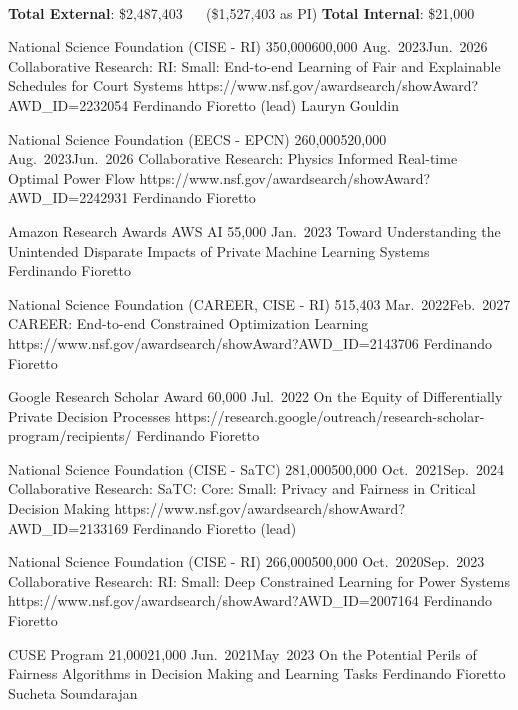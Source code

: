 \
\begin{keywords}
{\textbf{Total External}: \$2,487,403 ~~ (\$1,527,403 as PI) \hspace{8pt} \textbf{Total Internal}: \$21,000}%
\end{keywords}


\begin{projects}
	\grantentrycoPI
	{National Science Foundation (CISE - RI)}
	{350,000}{600,000}
	{Aug.~2023}{Jun.~2026}
	{Collaborative Research: RI: Small: End-to-end Learning of Fair and Explainable Schedules for Court Systems}
	{https://www.nsf.gov/awardsearch/showAward?AWD_ID=2232054}
	{Ferdinando Fioretto (lead)}
	{Lauryn Gouldin}

	\grantentryPI
	{National Science Foundation (EECS - EPCN)}
	{260,000}{520,000}
	{Aug.~2023}{Jun.~2026}
	{Collaborative Research: Physics Informed Real-time Optimal Power Flow}
	{https://www.nsf.gov/awardsearch/showAward?AWD_ID=2242931}
	{Ferdinando Fioretto}

	\grantentrySinglePI
	{Amazon Research Awards AWS AI}
	{55,000}
	{Jan.~2023}{}
	{Toward Understanding the Unintended Disparate Impacts of  Private Machine Learning Systems}
	{~}
	{Ferdinando Fioretto}

	\grantentrySinglePI
	{National Science Foundation (CAREER, CISE - RI)}
	{515,403}
	{Mar.~2022}{Feb.~2027}
	{CAREER: End-to-end Constrained Optimization Learning}
	{https://www.nsf.gov/awardsearch/showAward?AWD_ID=2143706}
	{Ferdinando Fioretto}

	\grantentrySinglePI
	{Google Research Scholar Award}
	{60,000}
	{Jul.~2022}{}
	{On the Equity of Differentially Private Decision Processes}
	{https://research.google/outreach/research-scholar-program/recipients/}
	{Ferdinando Fioretto}

	\grantentryPI
	{National Science Foundation (CISE - SaTC)}
	{281,000}{500,000}
	{Oct.~2021}{Sep.~2024}
	{Collaborative Research: SaTC: Core: Small: Privacy and Fairness in Critical Decision Making}
	{https://www.nsf.gov/awardsearch/showAward?AWD_ID=2133169}
	{Ferdinando Fioretto (lead)}

	\grantentryPI
	{National Science Foundation (CISE - RI)}
	{266,000}{500,000}
	{Oct.~2020}{Sep.~2023}
	{Collaborative Research: RI: Small: Deep Constrained Learning for Power Systems}
	{https://www.nsf.gov/awardsearch/showAward?AWD_ID=2007164}
	{Ferdinando Fioretto}

	\grantentrycoPI
	{CUSE Program}
	{21,000}{21,000}
	{Jun.~2021}{May~2023}
	{On the Potential Perils of Fairness Algorithms in Decision Making and Learning Tasks}
	{}
	{Ferdinando Fioretto}
	{Sucheta Soundarajan}
\end{projects}

